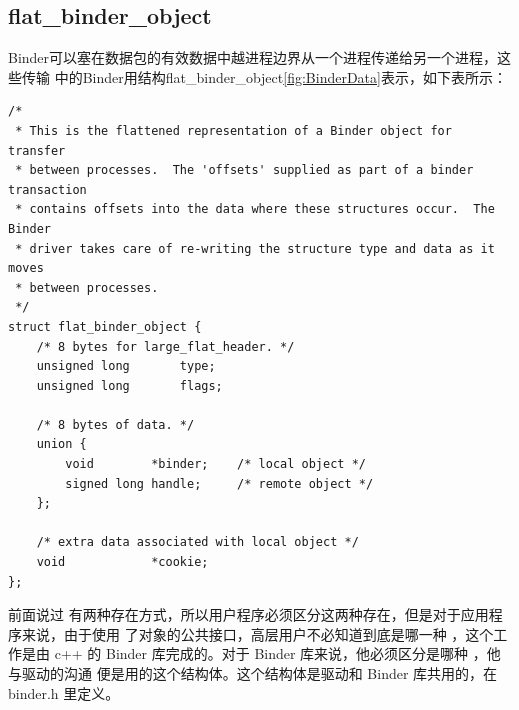 \documentclass[a4paper,11pt]{article}
\begin{document}
\subsection{flat_binder_object}
Binder可以塞在数据包的有效数据中越进程边界从一个进程传递给另一个进程，这些传输
中的Binder用结构flat_binder_object\ref{fig:BinderData}表示，如下表所示： 

\begin{lstlisting}[caption={flat\_binder\_object}, label=flatbinderobject]
/*
 * This is the flattened representation of a Binder object for transfer
 * between processes.  The 'offsets' supplied as part of a binder transaction
 * contains offsets into the data where these structures occur.  The Binder
 * driver takes care of re-writing the structure type and data as it moves
 * between processes.
 */
struct flat_binder_object {
	/* 8 bytes for large_flat_header. */
	unsigned long		type;
	unsigned long		flags;

	/* 8 bytes of data. */
	union {
		void		*binder;	/* local object */
		signed long	handle;		/* remote object */
	};

	/* extra data associated with local object */
	void			*cookie;
};

\end{lstlisting}
前面说过 \binder
有两种存在方式，所以用户程序必须区分这两种存在，但是对于应用程序来说，由于使用
了对象的公共接口，高层用户不必知道到底是哪一种 \binder ，这个工作是由 c++ 的
Binder 库完成的。对于 Binder 库来说，他必须区分是哪种 \binder ，他与驱动的沟通
便是用的这个结构体。这个结构体是驱动和 Binder 库共用的，在 binder.h 里定义。
\end{document}
